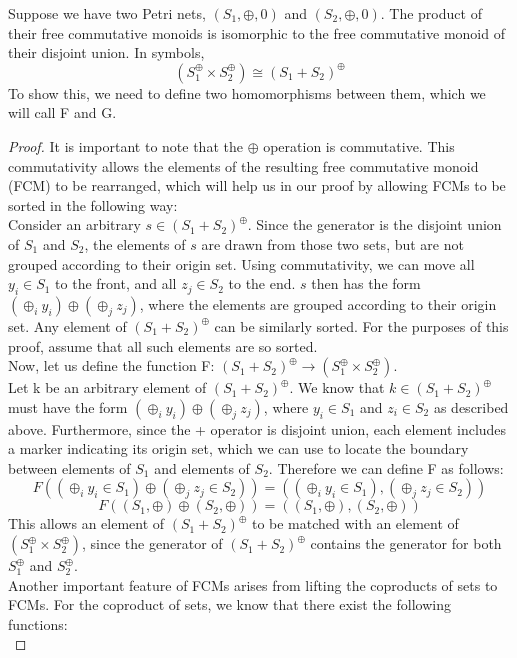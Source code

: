 \begin{lemma}
Suppose we have two Petri nets, $(S_1, \oplus, 0)$ and $(S_2, \oplus, 0)$. The product of their free commutative monoids is isomorphic to the free commutative monoid of their disjoint union. In symbols,
\[(S_1 ^\oplus \times S_2 ^\oplus) \cong (S_1 + S_2)^\oplus\]
To show this, we need to define two homomorphisms between them, which we will call F and G.
\begin{proof}
It is important to note that the $\oplus$ operation is commutative. This commutativity allows the elements of the resulting free commutative monoid (FCM) to be rearranged, which will help us in our proof by allowing FCMs to be sorted in the following way:\bigskip\\
Consider an arbitrary $s \in (S_1 + S_2)^\oplus$. Since the generator is the disjoint union of $S_1$ and $S_2$, the elements of $s$ are drawn from those two sets, but are not grouped according to their origin set. Using commutativity, we can move all $y_i \in S_1$ to the front, and all $z_j \in S_2$ to the end. $s$ then has the form $(\oplus_i y_i) \oplus (\oplus_j z_j)$, where the elements are grouped according to their origin set. Any element of $(S_1 + S_2)^\oplus$ can be similarly sorted. For the purposes of this proof, assume that all such elements are so sorted.\bigskip \\
Now, let us define the function F: $(S_1 + S_2)^\oplus \rightarrow (S_1 ^\oplus \times S_2 ^\oplus)$.\\
Let k be an arbitrary element of $(S_1 + S_2)^\oplus$. We know that $k \in (S_1 + S_2)^\oplus$ must have the form $(\oplus_i y_i) \oplus (\oplus_j z_j)$, where $y_i \in S_1$ and $z_i \in S_2$ as described above. Furthermore, since the + operator is disjoint union, each element includes a marker indicating its origin set, which we can use to locate the boundary between elements of $S_1$ and elements of $S_2$. Therefore we can define F as follows:\\
\[F((\oplus_i y_i \in S_1) \oplus (\oplus_j z_j \in S_2)) = ((\oplus_i y_i \in S_1), (\oplus_j z_j \in S_2))\]
\[F((S_1, \oplus) \oplus (S_2, \oplus)) = ((S_1, \oplus), (S_2, \oplus))\]
This allows an element of $(S_1 + S_2)^\oplus$ to be matched with an element of $(S_1 ^\oplus \times S_2 ^\oplus)$, since the generator of $(S_1 + S_2)^\oplus$ contains the generator for both $S_1^\oplus$ and $S_2^\oplus$.\bigskip\\ 
Another important feature of FCMs arises from lifting the coproducts of sets to FCMs. For the coproduct of sets, we know that there exist the following functions:\\

\end{proof}
\end{lemma}
